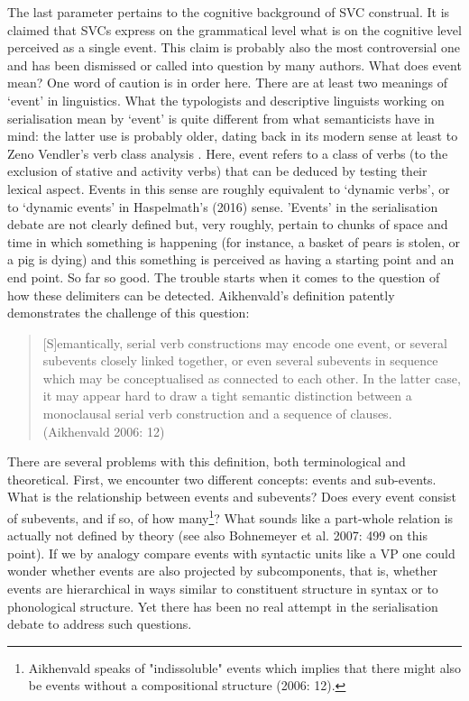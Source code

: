 The last parameter pertains to the cognitive background of SVC construal. It is claimed that SVCs express on the grammatical level what is on the cognitive level perceived as a single event. This claim is probably also the most controversial one and has been dismissed or called into question by many authors. What does event mean? One word of caution is in order here. There are at least two meanings of `event' in linguistics. What the typologists and descriptive linguists working on serialisation mean by `event' is quite different from what semanticists have in mind: the latter use is probably older, dating back in its modern sense at least to Zeno Vendler's verb class analysis \parencite{vendler1957verbs}. Here, event refers to a class of verbs (to the exclusion of stative and activity verbs) that can be deduced by testing their lexical aspect. Events in this sense are roughly equivalent to `dynamic verbs', or to `dynamic events' in Haspelmath's (2016) sense. 'Events' in the serialisation debate are not clearly defined but, very roughly, pertain to chunks of space and time in which something is happening (for instance, a basket of pears is stolen, or a pig is dying) and this something is perceived as having a starting point and an end point. So far so good. The trouble starts when it comes to the question of how these delimiters can be detected. Aikhenvald's definition patently demonstrates the challenge of this question:

\begin{quote}[S]emantically, serial verb constructions may encode one event, or several subevents
closely linked together, or even several subevents in sequence which may be conceptualised as
connected to each other. In the latter case, it may appear hard to draw a tight semantic distinction
between a monoclausal serial verb construction and a sequence of clauses. (Aikhenvald 2006: 12)\end{quote} 

There are several problems with this definition, both terminological and theoretical. First, we encounter two different concepts: events and sub-events. What is the relationship between events and subevents? Does every event consist of subevents, and if so, of how many\footnote{Aikhenvald speaks of "indissoluble" events which implies that there might also be events without a compositional structure (2006: 12).}? What sounds like a part-whole relation is actually not defined by theory (see also Bohnemeyer et al. 2007: 499 on this point). If we by analogy compare events with syntactic units like a VP one could wonder whether events are also projected by subcomponents, that is, whether events are hierarchical in ways similar to constituent structure in syntax or to phonological structure. Yet there has been no real attempt in the serialisation debate to address such questions. 

